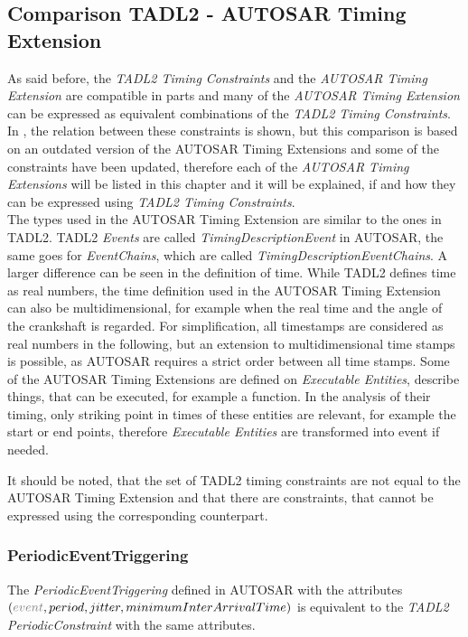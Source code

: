 \subsection{Comparison TADL2 - AUTOSAR Timing Extension}
\label{comparisonConstraints}
	As said before, the \emph{TADL2 Timing Constraints} and the \emph{AUTOSAR Timing Extension} are compatible in parts and many of the \emph{AUTOSAR Timing Extension} can be expressed as equivalent combinations of the \emph{TADL2 Timing Constraints}. In \cite{TIMMO2USE}, the relation between these constraints is shown, but this comparison is based on an outdated version of the AUTOSAR Timing Extensions and some of the constraints have been updated, therefore each of the \emph{AUTOSAR Timing Extensions} will be listed in this chapter and it will be explained, if and how they can be expressed using \emph{TADL2 Timing Constraints}.\\
	The types used in the AUTOSAR Timing Extension are similar to the ones in TADL2. TADL2 \emph{Events} are called \emph{TimingDescriptionEvent} in AUTOSAR, the same goes for \emph{EventChains}, which are called \emph{TimingDescriptionEventChains}. A larger difference can be seen in the definition of time. While TADL2 defines time as real numbers, the time definition used in the AUTOSAR Timing Extension can also be multidimensional, for example when the real time and the angle of the crankshaft is regarded. For simplification, all timestamps are considered as real numbers in the following, but an extension to multidimensional time stamps is possible, as AUTOSAR requires a strict order between all time stamps. Some of the AUTOSAR Timing Extensions are defined on \emph{Executable Entities}, describe things, that can be executed, for example a function. In the analysis of their timing, only striking point in times of these entities are relevant, for example the start or end points, therefore \emph{Executable Entities} are transformed into event if needed.
	
	It should be noted, that the set of TADL2 timing constraints are not equal to the AUTOSAR Timing Extension and that there are constraints, that cannot be expressed using the corresponding counterpart.

	\subsubsection{PeriodicEventTriggering}
		The \emph{PeriodicEventTriggering} defined in AUTOSAR with the attributes\\ $(\textcolor{gray}{event}, period, jitter, minimumInterArrivalTime)$ is equivalent to the \emph{TADL2} \emph{PeriodicConstraint} with the same attributes.
		
